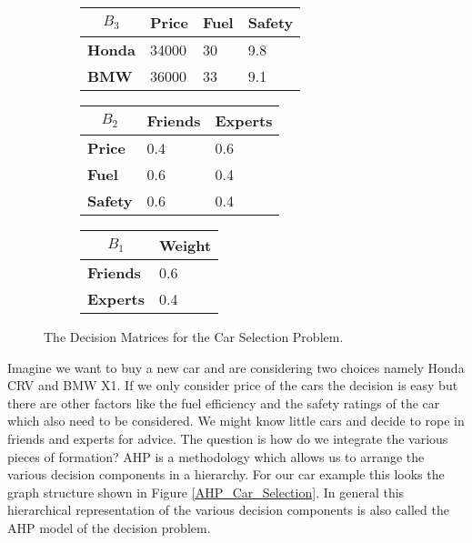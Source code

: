 \documentclass{jfp}
\begin{document}
\begin{figure}[t]
\begin{subfigure}{.4\textwidth}
\begin{small}
    \begin{tabular}{l|lll}
    \multicolumn{1}{c|}{$B_3$} 
    & \bf{Price}  & \bf{Fuel} & \bf{Safety} \\
    \hline  
    \bf{Honda}  & 34000 & 30 & 9.8  \\ 
    \bf{BMW}    & 36000 & 33 & 9.1  \\ 
    \end{tabular}
\end{small}
\end{subfigure}
\begin{subfigure}{.3\textwidth}
\begin{small}
    \begin{tabular}{l|ll}
    \multicolumn{1}{c|}{$B_2$} 
    & \bf{Friends}  & \bf{Experts}  \\
    \hline  
    \bf{Price}       & 0.4 & 0.6   \\ 
    \bf{Fuel}    & 0.6 & 0.4   \\
    \bf{Safety}    & 0.6 & 0.4   \\ 
    \end{tabular}
\end{small}
\end{subfigure}
\begin{subfigure}{.2\textwidth}
\begin{small}
    \begin{tabular}{l|l}
    \multicolumn{1}{c|}{$B_1$} 
    & \bf{Weight}   \\
    \hline  
    \bf{Friends}  & 0.6  \\ 
    \bf{Experts}  & 0.4    \\
    \end{tabular}
\end{small}
\end{subfigure}

\caption{The Decision Matrices for the Car Selection Problem.}
\label{fig:AHPExampleMatrices}
\end{figure}


Imagine we want to buy a new car and are considering two choices namely Honda CRV and BMW X1. If we only consider price of the cars the decision is easy but there are other factors like the fuel efficiency and the safety ratings of the car which also need to be considered. We might know little cars and decide to rope in friends and experts for advice. The question is how do we integrate the various pieces of formation? AHP is a methodology which allows us to arrange the various decision components in a hierarchy. For our car example this looks the graph structure shown in Figure \ref{AHP_Car_Selection}. In general this hierarchical representation of the various decision components is also called the AHP model of the decision problem. 
\end{document}
